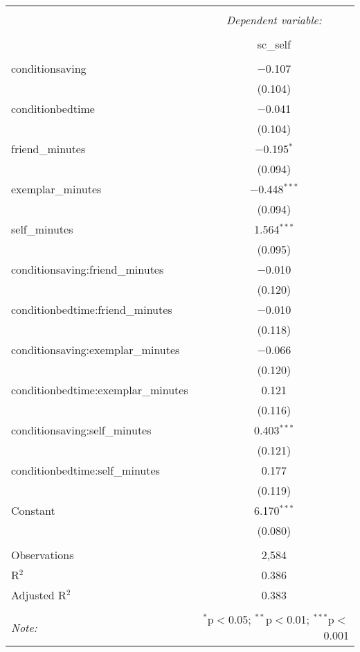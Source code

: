 
\begin{table}[!htbp] \centering 
  \caption{} 
  \label{} 
\begin{tabular}{@{\extracolsep{5pt}}lc} 
\\[-1.8ex]\hline 
\hline \\[-1.8ex] 
 & \multicolumn{1}{c}{\textit{Dependent variable:}} \\ 
\cline{2-2} 
\\[-1.8ex] & sc\_self \\ 
\hline \\[-1.8ex] 
 conditionsaving & $-$0.107 \\ 
  & (0.104) \\ 
  conditionbedtime & $-$0.041 \\ 
  & (0.104) \\ 
  friend\_minutes & $-$0.195$^{*}$ \\ 
  & (0.094) \\ 
  exemplar\_minutes & $-$0.448$^{***}$ \\ 
  & (0.094) \\ 
  self\_minutes & 1.564$^{***}$ \\ 
  & (0.095) \\ 
  conditionsaving:friend\_minutes & $-$0.010 \\ 
  & (0.120) \\ 
  conditionbedtime:friend\_minutes & $-$0.010 \\ 
  & (0.118) \\ 
  conditionsaving:exemplar\_minutes & $-$0.066 \\ 
  & (0.120) \\ 
  conditionbedtime:exemplar\_minutes & 0.121 \\ 
  & (0.116) \\ 
  conditionsaving:self\_minutes & 0.403$^{***}$ \\ 
  & (0.121) \\ 
  conditionbedtime:self\_minutes & 0.177 \\ 
  & (0.119) \\ 
  Constant & 6.170$^{***}$ \\ 
  & (0.080) \\ 
 \hline \\[-1.8ex] 
Observations & 2,584 \\ 
R$^{2}$ & 0.386 \\ 
Adjusted R$^{2}$ & 0.383 \\ 
\hline 
\hline \\[-1.8ex] 
\textit{Note:}  & \multicolumn{1}{r}{$^{*}$p$<$0.05; $^{**}$p$<$0.01; $^{***}$p$<$0.001} \\ 
\end{tabular} 
\end{table} 
